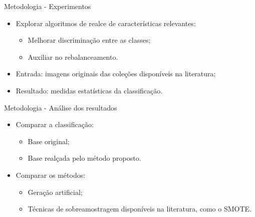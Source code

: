 \documentclass{beamer}
\begin{document}
\begin{frame}{Metodologia - Experimentos}
\setlength\leftmargini{1em}
\begin{block}{}
\justifying
\begin{itemize}
\item Explorar algoritmos de realce de características relevantes:
\begin{itemize}
\item Melhorar discriminação entre as classes;
\item Auxiliar no rebalanceamento.
\end{itemize}
\item Entrada: imagens originais das coleções disponíveis na literatura;
\item Resultado: medidas estatísticas da classificação.
\end{itemize}
\end{block}
\end{frame}
\begin{frame}{Metodologia - Análise dos resultados}
\setlength\leftmargini{1em}
\begin{block}{}
\justifying
\begin{itemize}
\item Comparar a classificação:
\begin{itemize}
\item Base original;
\item Base realçada pelo método proposto.
\end{itemize}
\item Comparar os métodos:
\begin{itemize}
\item Geração artificial;
\item Técnicas de sobreamostragem disponíveis na literatura, como o SMOTE.
\end{itemize}
\end{itemize}
\end{block}
\end{frame}
\end{document}
